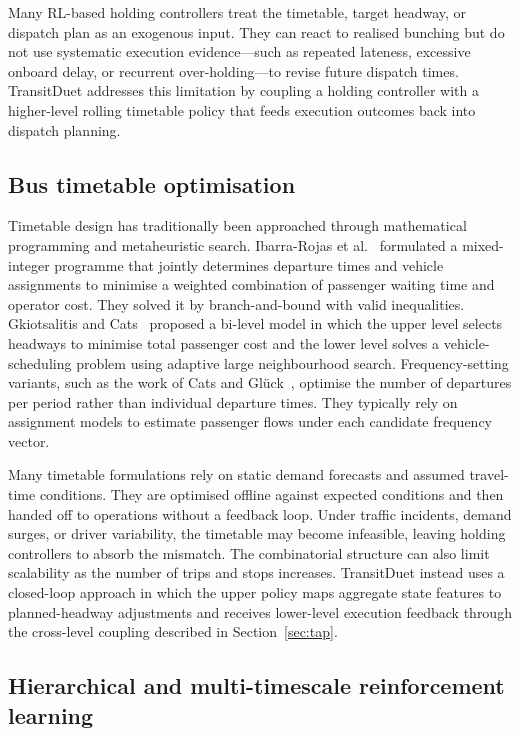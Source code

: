 Many RL-based holding controllers treat the timetable, target headway, or dispatch plan as an exogenous input. They can react to realised bunching but do not use systematic execution evidence---such as repeated lateness, excessive onboard delay, or recurrent over-holding---to revise future dispatch times. TransitDuet addresses this limitation by coupling a holding controller with a higher-level rolling timetable policy that feeds execution outcomes back into dispatch planning.

\subsection{Bus timetable optimisation}
\label{subsec:timetable_opt}

Timetable design has traditionally been approached through mathematical programming and metaheuristic search. Ibarra-Rojas et al.~\citep{ibarra2015planning} formulated a mixed-integer programme that jointly determines departure times and vehicle assignments to minimise a weighted combination of passenger waiting time and operator cost. They solved it by branch-and-bound with valid inequalities. Gkiotsalitis and Cats~\citep{gkiotsalitis2021bus} proposed a bi-level model in which the upper level selects headways to minimise total passenger cost and the lower level solves a vehicle-scheduling problem using adaptive large neighbourhood search. Frequency-setting variants, such as the work of Cats and Gl{\"u}ck~\citep{cats2019frequency}, optimise the number of departures per period rather than individual departure times. They typically rely on assignment models to estimate passenger flows under each candidate frequency vector.

Many timetable formulations rely on static demand forecasts and assumed travel-time conditions. They are optimised offline against expected conditions and then handed off to operations without a feedback loop. Under traffic incidents, demand surges, or driver variability, the timetable may become infeasible, leaving holding controllers to absorb the mismatch. The combinatorial structure can also limit scalability as the number of trips and stops increases. TransitDuet instead uses a closed-loop approach in which the upper policy maps aggregate state features to planned-headway adjustments and receives lower-level execution feedback through the cross-level coupling described in Section~\ref{sec:tap}.

\subsection{Hierarchical and multi-timescale reinforcement learning}
\label{subsec:hierarchical_rl}


